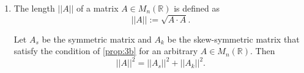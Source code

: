\begin{enumerate}
\begin{enumerate}
\begin{proof}
                    Assume that $A = A_s + A_k = B_s + B_k$, where $A_s$, $B_s$ are symmetric matrices, and $A_k$, $B_k$ are skew-symmetric matrices.

                    \smallskip

                    \begin{claim} \label{claim:3b-2}
                        $A_s = B_s$ and $A_k = B_k$.
                    \end{claim}

                    \begin{subproof}
                        Note that $(A_s + A_k)^T = A_s - A_k$ and $(B_s + B_k)^T = B_s - B_k$.
                        Consider the sum $A + A^T$.
                        We have
                        \[
                            A + A^T = (A_s + A_k) + (A_s - A_k) = 2 A_s,
                        \]
                        and
                        \[
                            A + A^T = (B_s + B_k) + (B_s - B_k) = 2 B_s.
                        \]
                        It follows that $A_s = B_s$.

                        From the equation $A_s + A_k = B_s + B_k$, we have
                        \[ A_k - B_k = B_s - A_s = 0, \]
                        hence $A_k = B_k$.
                        This completes the proof. \qedhere
                    \end{subproof}
                \end{proof}

                \bigskip

            \item The length $||A||$ of a matrix $A \in M_n(\mathbb{R})$ is defined as
                \[ ||A|| := \sqrt{A \cdot A}. \]

                \begin{proposition}
                    Let $A_s$ be the symmetric matrix and $A_k$ be the skew-symmetric matrix that satisfy the condition of \cref{prop:3b} for an arbitrary $A \in M_n(\mathbb{R})$.
                    Then
                    \[ {||A||}^2 = {||A_s||}^2 + {||A_k||}^2. \]
                \end{proposition}

                \smallskip


\end{enumerate}
\end{enumerate}
